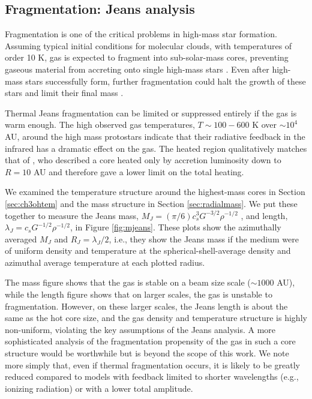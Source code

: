 \documentclass{emulateapj}
\begin{document}
\subsection{Fragmentation: Jeans analysis}
\label{sec:fragmentation}
Fragmentation is one of the critical problems in high-mass star formation.
Assuming typical initial conditions for molecular clouds, with temperatures of
order 10 K, gas is expected to fragment into sub-solar-mass cores, preventing gaseous
material from accreting onto single high-mass stars \citep{Krumholz2015a}.
Even after high-mass stars successfully form, further fragmentation could
halt the growth of these stars and limit their final mass \citep{Peters2010a}.

Thermal Jeans fragmentation can be limited or suppressed entirely if the gas is
warm enough.  The high observed gas temperatures, $T\sim100-600$ K over
$\sim10^4$ AU, around the high mass protostars indicate that their radiative
feedback in the infrared has a dramatic effect on the gas.  The heated region
qualitatively matches that of \citet{Krumholz2006a}, who described
a core heated only by accretion luminosity down to $R=10$ AU and therefore
gave a lower limit on the total heating. 

We examined the temperature structure around the highest-mass cores in Section
\ref{sec:ch3ohtem} and the mass structure in Section \ref{sec:radialmass}.  We
put these together to measure the Jeans mass, $M_J = (\pi / 6) c_s^3
G^{-3/2} \rho^{-1/2}$
, and length, $\lambda_J = c_s G^{-1/2} \rho^{-1/2}$, 
in
Figure \ref{fig:mjeans}.  These plots show the azimuthally averaged $M_J$
and $R_J=\lambda_J/2$,
i.e., they show the Jeans mass if the medium
were of uniform density and temperature at the spherical-shell-average density
and azimuthal average temperature at each plotted radius.

The mass figure shows that the gas is stable on a beam size scale ($\sim1000$ AU),
while the length figure shows that on larger scales, the gas is unstable to
fragmentation.  However, on these larger scales, the Jeans length is about
the same as the hot core size, and the gas density and temperature structure is
highly non-uniform, violating the key assumptions of the Jeans analysis.  
A more sophisticated analysis of the fragmentation propensity of the gas
in such a core structure would be worthwhile but is beyond the scope of
this work.  We note more simply that, even if thermal fragmentation occurs, it
is likely to be greatly reduced compared to models with feedback limited to
shorter wavelengths (e.g., ionizing radiation) or with a lower total amplitude.
\end{document}

